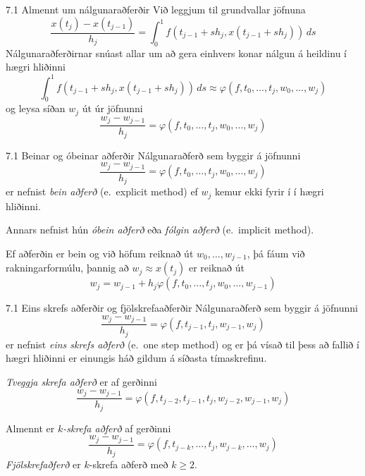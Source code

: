 \begin{frame}{7.1 Almennt um nálgunaraðferðir} 
Við leggjum til grundvallar jöfnuna
$$
  \dfrac{x(t_j)-x(t_{j-1})}{h_j}=\int_0^1f(t_{j-1}+sh_j,x(t_{j-1}+sh_j))\, ds
$$
Nálgunaraðferðirnar snúast allar um að gera einhvers konar nálgun á
heildinu í hægri hliðinni
$$
  \int_0^1f(t_{j-1}+sh_j,x(t_{j-1}+sh_j))\, ds
  \approx \varphi(f,t_0,\dots,t_j,w_0,\dots,w_j)
$$
og leysa síðan $w_j$ út úr jöfnunni 
$$
  \dfrac{w_j-w_{j-1}}{h_j}=\varphi(f,t_0,\dots,t_j,w_0,\dots,w_j)
$$
\end{frame}


\begin{frame}{7.1 Beinar og óbeinar aðferðir} 
Nálgunaraðferð sem byggir á jöfnunni
$$
  \dfrac{w_j-w_{j-1}}{h_j}=\varphi(f,t_{0},\dots,t_j,w_{0},\dots,w_j)
$$
er nefnist {\it bein aðferð} (e.~explicit method) ef 
$w_j$ kemur ekki fyrir í í hægri hliðinni.  

\smallskip
Annars nefnist hún  {\it óbein aðferð} eða {\it fólgin aðferð} 
(e.~implicit method).

\smallskip
Ef aðferðin er bein og við höfum reiknað út $w_0,\dots,w_{j-1}$,
þá fáum við rakningarformúlu, þannig að 
$w_j\approx x(t_j)$ er reiknað út
$$
  w_j=w_{j-1}+h_j\varphi(f,t_{0},\dots,t_j,w_{0},\dots,w_{j-1})
$$
\end{frame}


\begin{frame}{7.1 Eins skrefs aðferðir og fjölskrefaaðferðir} 
Nálgunaraðferð sem byggir á jöfnunni
$$
  \dfrac{w_j-w_{j-1}}{h_j}=\varphi(f,t_{j-1},t_j,w_{j-1},w_j)
$$
er nefnist {\it eins skrefs aðferð} (e.~one step method) og er þá
vísað til þess að fallið í hægri hliðinni er einungis háð gildum á
síðasta tímaskrefinu.

\pause
\smallskip
{\it Tveggja skrefa aðferð} er af gerðinni
$$
  \dfrac{w_j-w_{j-1}}{h_j}=\varphi(f,t_{j-2},t_{j-1},t_j,w_{j-2},w_{j-1},w_j)
$$

\pause
\smallskip
Almennt er {\it $k$-skrefa aðferð} af gerðinni
$$
\dfrac{w_j-w_{j-1}}{h_j}=\varphi(f,t_{j-k},\dots,t_j,w_{j-k},\dots,w_j)
$$
{\it Fjölskrefaðferð} er  $k$-skrefa aðferð með $k\geq 2$.
\end{frame}


